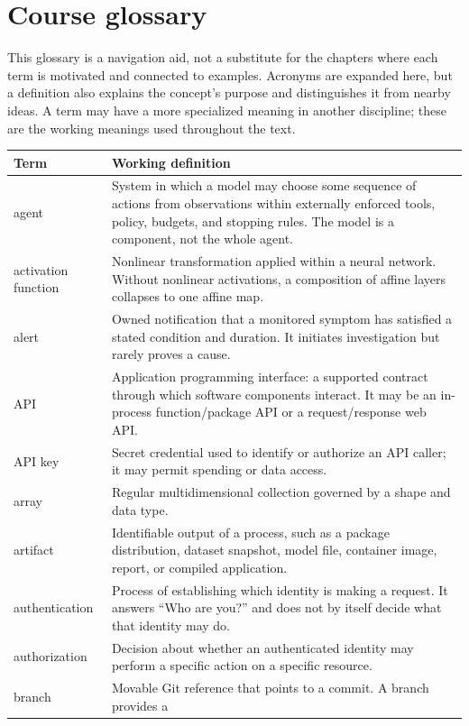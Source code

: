 \chapter{Course glossary}
\label{app:glossary}

This glossary is a navigation aid, not a substitute for the chapters where each
term is motivated and connected to examples. Acronyms are expanded here, but a
definition also explains the concept's purpose and distinguishes it from nearby
ideas. A term may have a more specialized meaning in another discipline; these
are the working meanings used throughout the text.

\begin{longtable}{@{}p{}p{}@{}}
\toprule
\textbf{Term} & \textbf{Working definition} \\
\midrule
\endhead
agent & System in which a model may choose some sequence of actions from
observations within externally enforced tools, policy, budgets, and stopping
rules. The model is a component, not the whole agent. \\
activation function & Nonlinear transformation applied within a neural network.
Without nonlinear activations, a composition of affine layers collapses to one
affine map. \\
alert & Owned notification that a monitored symptom has satisfied a stated
condition and duration. It initiates investigation but rarely proves a cause. \\
API & Application programming interface: a supported contract through which
software components interact. It may be an in-process function/package API or
a request/response web API. \\
API key & Secret credential used to identify or authorize an API caller; it may
permit spending or data access. \\
array & Regular multidimensional collection governed by a shape and data type. \\
artifact & Identifiable output of a process, such as a package distribution,
dataset snapshot, model file, container image, report, or compiled application. \\
authentication & Process of establishing which identity is making a request.
It answers ``Who are you?'' and does not by itself decide what that identity may
do. \\
authorization & Decision about whether an authenticated identity may perform a
specific action on a specific resource. \\
branch & Movable Git reference that points to a commit. A branch provides a

\end{longtable}

